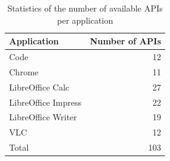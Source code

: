 \begin{table}[htbp]
\centering
\caption{Statistics of the number of available APIs per application}
\label{tab:tool_number}
\begin{tabular}{@{}l r@{}}
\toprule
Application & Number of APIs \\
\midrule
Code                 & 12 \\
Chrome               & 11 \\
LibreOffice Calc     & 27 \\
LibreOffice Impress  & 22 \\
LibreOffice Writer   & 19 \\
VLC                  & 12 \\
\midrule
Total                & 103 \\
\bottomrule
\end{tabular}
\end{table}